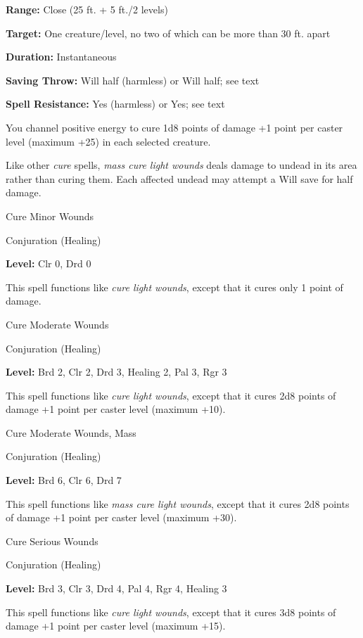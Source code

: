 \documentclass{article}
\begin{document}
\textbf{Range:} Close (25 ft. + 5 ft./2 levels)

\textbf{Target:} One creature/level, no two of which can be more than 30 ft. apart

\textbf{Duration:} Instantaneous

\textbf{Saving Throw: }Will half (harmless) or Will half; see text

\textbf{Spell Resistance:} Yes (harmless) or Yes; see text

You channel positive energy to cure 1d8 points of damage +1 point per caster level 
(maximum +25) in each selected creature.

Like other \textit{cure }spells, \textit{mass cure light wounds }deals damage to 
undead in its area rather than curing them. Each affected undead may attempt a 
Will save for half damage.

\vspace{12pt}
Cure Minor Wounds

Conjuration (Healing)

\textbf{Level:} Clr 0, Drd 0

This spell functions like \textit{cure light wounds}, except that it cures only 
1 point of damage.

\vspace{12pt}
Cure Moderate Wounds

Conjuration (Healing)

\textbf{Level:} Brd 2, Clr 2, Drd 3, Healing 2, Pal 3, Rgr 3

This spell functions like \textit{cure light wounds}, except that it cures 2d8 
points of damage +1 point per caster level (maximum +10).

\vspace{12pt}
Cure Moderate Wounds, Mass

Conjuration (Healing)

\textbf{Level:} Brd 6, Clr 6, Drd 7

This spell functions like \textit{mass cure light wounds}, except that it cures 
2d8 points of damage +1 point per caster level (maximum +30).

\vspace{12pt}
Cure Serious Wounds

Conjuration (Healing)

\textbf{Level:} Brd 3, Clr 3, Drd 4, Pal 4, Rgr 4, Healing 3

This spell functions like \textit{cure light wounds}, except that it cures 3d8 
points of damage +1 point per caster level (maximum +15).
\end{document}
